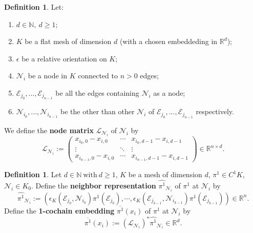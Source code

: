 \documentclass[fleqn]{article}
\theoremstyle{definition}
\newtheorem{definition}[theorem]{Definition}
\newcommand{\N}{\mathbb{N}}
\newcommand{\R}{\mathbb{R}}
\begin{document}
\begin{definition}
  Let:
  \begin{enumerate}
    \item
      $d \in \N,\ d \geq 1$;
    \item
      $K$ be a flat mesh of dimension $d$
      (with a chosen embeddeding in $\R^d$);
    \item
      $\epsilon$ be a relative orientation on $K$;
    \item
      $\mathcal{N}_i$ be a node in $K$ connected to $n > 0$ edges;
    \item
      $\mathcal{E}_{j_0}, ..., \mathcal{E}_{j_{n - 1}}$ be all the edges
      containing $\mathcal{N}_i$ as a node;
    \item
      $\mathcal{N}_{i_0}, ..., \mathcal{N}_{i_{n - 1}}$ be the other than
      other $\mathcal{N}_i$ of
      $\mathcal{E}_{j_0}, ..., \mathcal{E}_{j_{n - 1}}$ respectively.
  \end{enumerate}
  We define the \textbf{node matrix} $\mathcal{L}_{\mathcal{N}_i}$ of
  $\mathcal{N}_i$ by
  \begin{equation}
    \mathcal{L}_{\mathcal{N}_i} :=
    \begin{pmatrix}
      x_{i_0, 0} - x_{i, 0} & \cdots & x_{i_0, d - 1} - x_{i, d - 1} \\
      \vdots & \ddots & \vdots \\
      x_{i_{n - 1}, 0} - x_{i, 0} & \cdots & x_{i_{n - 1}, d - 1} - x_{i, d - 1}
    \end{pmatrix}
    \in \R^{n \times d}.
  \end{equation}
\end{definition}

\begin{definition}
  Let $d \in \N\ \text{with}\ d \geq 1$, $K$ be a mesh of dimension $d$,
  $\pi^1 \in C^1 K$, $\mathcal{N}_i \in K_0$.
  Define the \textbf{neighbor representation} $\widehat{\pi^1}_{\mathcal{N}_i}$
  of $\pi^1$ at $\mathcal{N}_i$ by
  \begin{equation}
    \widehat{\pi^1}_{\mathcal{N}_i} :=
    ( \epsilon_K(\mathcal{E}_{j_0}, \mathcal{N}_{i_0}) \pi^1(\mathcal{E}_{j_0}),
      \cdots,
        \epsilon_K(\mathcal{E}_{j_{k - 1}}, \mathcal{N}_{i_{k - 1}})
        \pi^1(\mathcal{E}_{j_{k - 1}})
    ) \in \R^n.
  \end{equation}
  Define the \textbf{1-cochain embedding} $\overline{\pi^1}(x_i)$
  of $\pi^1$ at $\mathcal{N}_i$ by
  \begin{equation}
    \overline{\pi^1}(x_i) :=
    \left(\mathcal{L}_{\mathcal{N}_i}\right)^* \widehat{\pi^1}_{\mathcal{N}_i}
    \in \R^d.
  \end{equation}
\end{definition}
\end{document}
